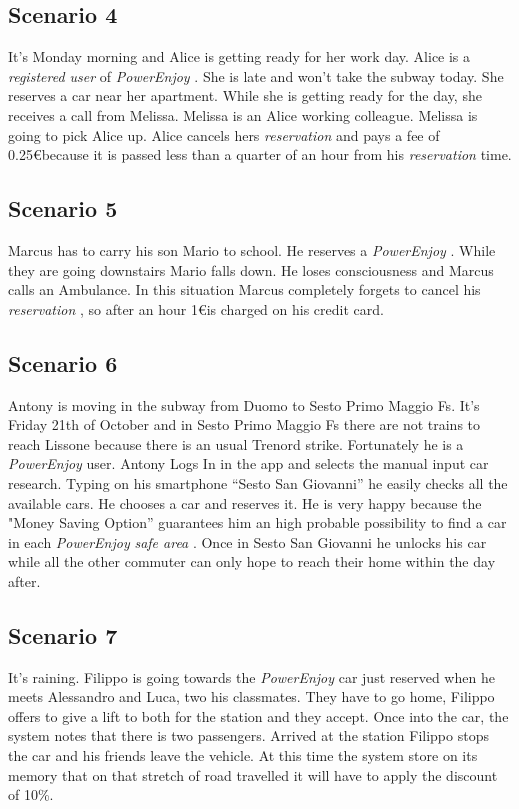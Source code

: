 \documentclass[english]{article}
\newcommand{\powerenjoy}{\textit{PowerEnjoy }}
\newcommand{\registereduser}{\textit {registered user }}
\newcommand{\safearea}{\textit{safe area }}
\newcommand{\reservation}{\textit{reservation }}
\begin{document}
	\subsection{Scenario 4}
		It's Monday morning and Alice is getting ready for her work day. Alice is a \registereduser of \powerenjoy . She is late and won't take the subway today. She reserves a car near her apartment. While she is getting ready for the day, she receives a call from Melissa. Melissa is an Alice working colleague. Melissa is going to pick Alice up. Alice cancels hers \reservation and pays a fee of 0.25\euro because it is passed less than a quarter of an hour from his \reservation time.
	\subsection{Scenario 5}
		Marcus has to carry his son Mario to school. He reserves a \powerenjoy. While they are going downstairs Mario falls down. He loses consciousness and Marcus calls an Ambulance. In this situation Marcus completely forgets to cancel his \reservation, so after an hour 1\euro is charged	on his credit card.
	\subsection{Scenario 6}
		Antony is moving in the subway from Duomo to Sesto Primo Maggio Fs. It's Friday 21th of October and in Sesto Primo Maggio Fs there are not trains to reach Lissone because there is an usual Trenord strike. Fortunately he is a \powerenjoy user. Antony Logs In in the app and selects the manual input car research. Typing on his smartphone ``Sesto San Giovanni'' he easily checks all the available  cars. He chooses a car and reserves it. He is very happy because the "Money Saving Option'' guarantees him an high probable possibility to find a car in each \powerenjoy \safearea. Once in Sesto San Giovanni he unlocks his car while all the other commuter can only hope to reach their home within the day after.
	\subsection{Scenario 7}
		It's raining. Filippo is going towards the \powerenjoy car just reserved when he meets Alessandro and Luca, two his classmates. They have to go home, Filippo offers to give a lift to both for the station and they accept. Once into the car, the system notes that there is two passengers. Arrived at the station Filippo stops the car and his friends leave the vehicle. At this time the system store on its memory that on that stretch of road travelled it will have to apply the discount of 10\%.
\end{document}
